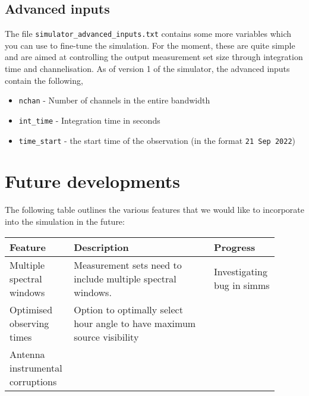 \documentclass[11pt]{report_jfr}
\begin{document}
\subsection{Advanced inputs}

The file \texttt{simulator\_advanced\_inputs.txt} contains some more variables which you can use to fine-tune the simulation. For the moment, these are quite simple and are aimed at controlling the output measurement set size through integration time and channelisation. As of version 1 of the simulator, the advanced inputs contain the following,
%
\begin{itemize}
	\item\texttt{nchan} - Number of channels in the entire bandwidth
	\item\texttt{int\_time} - Integration time in seconds
	\item\texttt{time\_start} - the start time of the observation (in the format \texttt{21 Sep 2022})
\end{itemize}




\section{Future developments}

The following table outlines the various features that we would like to incorporate into the simulation in the future:
%
\begin{longtable}{p{0.2\linewidth}p{0.5\linewidth}p{0.2\linewidth}}
	\toprule
	\textbf{Feature} & \textbf{Description} & \textbf{Progress} \\
	\hline\endhead
	Multiple spectral windows & Measurement sets need to include multiple spectral windows. &  Investigating bug in simms \\
	Optimised observing times & Option to optimally select hour angle to have maximum source visibility & \\
	Antenna instrumental corruptions & & \\
	\bottomrule
\end{longtable}
\appendix
\end{document}

